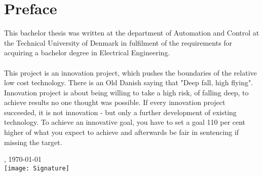 \chapter{Preface}
This bachelor thesis was written at the department of Automation and Control at the Technical University of Denmark in fulfilment of the requirements for acquiring a bachelor degree in Electrical Engineering.\\
\\
\noindent
This project is an innovation project, which pushes the boundaries of the relative low cost technology. There is an Old Danish saying that "Deep fall, high flying". Innovation project is about being willing to take a high risk, of falling deep, to achieve results no one thought was possible. If every innovation project succeeded, it is not innovation - but only a further development of existing technology. To achieve an innovative goal, you have to set a goal 110 per cent higher of what you expect to achieve and afterwards be fair in sentencing if missing the target.

\vfill

{
\centering
    \thesislocation{}, \today\\[1cm]
    \hspace{3cm}\texttt{[image: Signature]}\\[1cm]
\begin{flushright}
    \thesisauthor{}
\end{flushright}
}